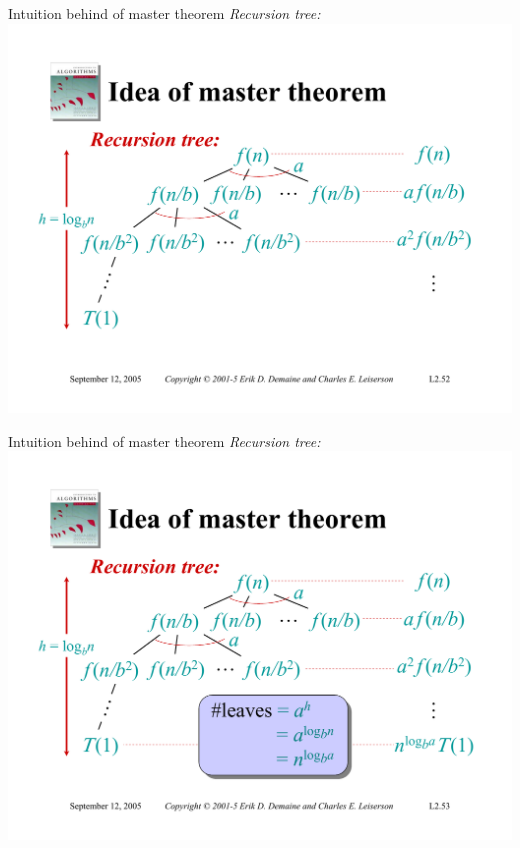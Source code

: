 \documentclass{beamer}
\begin{document}
\begin{frame}{Intuition behind of master theorem}
    \textit{Recursion tree:}\\
    \vspace{5mm}
    \includegraphics[width=\textwidth, trim={1.10cm 1.20cm 0.30cm 5.50cm}, clip]{pages/lec2_52}
\end{frame}
\begin{frame}{Intuition behind of master theorem}
    \textit{Recursion tree:}\\
    \vspace{5mm}
    \includegraphics[width=\textwidth, trim={1.10cm 1.20cm 0.30cm 5.50cm}, clip]{pages/lec2_53}
\end{frame}
\end{document}
